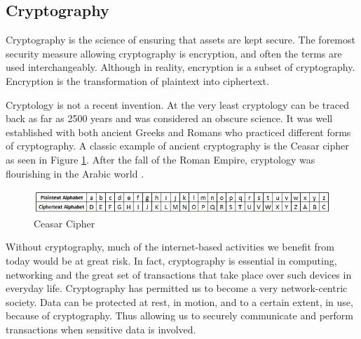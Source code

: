 

\subsection{Cryptography}
Cryptography is the science of ensuring that assets are kept secure. The foremost security measure allowing cryptography is encryption, and often the terms are used interchangeably. Although in reality, encryption is a subset of cryptography. Encryption is the transformation of plaintext into ciphertext. 

Cryptology is not a recent invention. At the very least cryptology can be traced back as far as 2500 years and was considered an obscure science. It was well established with both ancient Greeks and Romans who practiced different forms of cryptography. A classic example of ancient cryptography is the Ceasar cipher as seen in Figure \ref{fig:ceasar-cipher}. After the fall of the Roman Empire, cryptology was flourishing in the Arabic world \cite{dooley2018history}.

\begin{figure}[!h]
    \includegraphics[width=\textwidth]{../../img/chapter_2/ceasar-cipher.jpg}
    \caption{Ceasar Cipher}\label{fig:ceasar-cipher}
\end{figure}

Without cryptography, much of the internet-based activities we benefit from today would be at great risk. In fact, cryptography is essential in computing, networking and the great set of transactions that take place over such devices in everyday life. Cryptography has permitted us to become a very network-centric society. 
Data can be protected at rest, in motion, and to a certain extent, in use, because of cryptography. Thus allowing us to securely communicate and perform transactions when sensitive data is involved.

